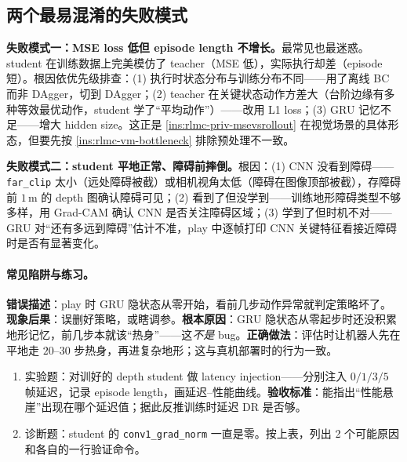 \subsection{两个最易混淆的失败模式}
\label{sec:rlmc-vm-failmodes}

\textbf{失败模式一：MSE loss 低但 episode length 不增长。}最常见也最迷惑。student 在训练数据上完美模仿了 teacher（MSE 低），实际执行却差（episode 短）。根因依优先级排查：(1) 执行时状态分布与训练分布不同——用了离线 BC 而非 DAgger，切到 DAgger；(2) teacher 在关键状态动作方差大（台阶边缘有多种等效最优动作，student 学了“平均动作”）——改用 L1 loss；(3) GRU 记忆不足——增大 hidden size。这正是 \cref{ins:rlmc-priv-msevsrollout} 在视觉场景的具体形态，但要先按 \cref{ins:rlmc-vm-bottleneck} 排除预处理不一致。

\textbf{失败模式二：student 平地正常、障碍前摔倒。}根因：(1) CNN 没看到障碍——\verb|far_clip| 太小（远处障碍被截）或相机视角太低（障碍在图像顶部被截），存障碍前 $1$\,m 的 depth 图确认障碍可见；(2) 看到了但没学到——训练地形障碍类型不够多样，用 Grad-CAM 确认 CNN 是否关注障碍区域；(3) 学到了但时机不对——GRU 对“还有多远到障碍”估计不准，play 中逐帧打印 CNN 关键特征看接近障碍时是否有显著变化。

\paragraph{常见陷阱与练习。}

\begin{pitfall}
\textbf{错误描述}：play 时 GRU 隐状态从零开始，看前几步动作异常就判定策略坏了。\textbf{现象后果}：误删好策略，或瞎调参。\textbf{根本原因}：GRU 隐状态从零起步时还没积累地形记忆，前几步本就该“热身”——这\emph{不是} bug。\textbf{正确做法}：评估时让机器人先在平地走 $20$--$30$ 步热身，再进复杂地形；这与真机部署时的行为一致。
\end{pitfall}

\begin{practice}[把诊断跑成一条曲线]
\begin{enumerate}
\item 实验题：对训好的 depth student 做 latency injection——分别注入 $0/1/3/5$ 帧延迟，记录 episode length，画延迟--性能曲线。\textbf{验收标准}：能指出“性能悬崖”出现在哪个延迟值；据此反推训练时延迟 DR 是否够。
\item 诊断题：student 的 \verb|conv1_grad_norm| 一直是零。按上表，列出 2 个可能原因和各自的一行验证命令。
\end{enumerate}
\end{practice}

